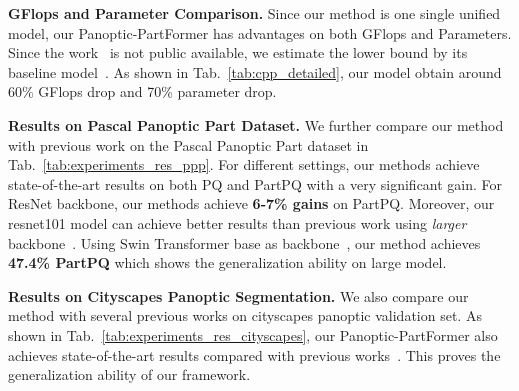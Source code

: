 \noindent
\textbf{GFlops and Parameter Comparison.} Since our method is one single unified model, our Panoptic-PartFormer has advantages on both GFlops and Parameters. Since the work~\cite{liang2020polytransform} is not public available, we estimate the lower bound by its baseline model~\cite{maskrcnn}.
As shown in Tab.~\ref{tab:cpp_detailed}, our model obtain around 60\% GFlops drop and 70\% parameter drop.

\noindent
\textbf{Results on Pascal Panoptic Part Dataset.} We further compare our method with previous work on the Pascal Panoptic Part dataset in Tab.~\ref{tab:experiments_res_ppp}. For different settings, our methods achieve state-of-the-art results on both PQ and PartPQ with a very significant gain. For ResNet backbone, our methods achieve \textbf{6-7\% gains} on PartPQ. Moreover, our resnet101 model can achieve better results than previous work using \textit{larger} backbone~\cite{qiao2021detectors}.
Using Swin Transformer base as backbone~\cite{liu2021swin}, our method achieves \textbf{47.4\% PartPQ} which shows the generalization ability on large model. 


\noindent
\textbf{Results on Cityscapes Panoptic Segmentation.}
We also compare our method with several previous works on cityscapes panoptic validation set. As shown in Tab.~\ref{tab:experiments_res_cityscapes}, our Panoptic-PartFormer also achieves state-of-the-art results compared with previous works~\cite{li2020panopticFCN,cheng2020panoptic}. This proves the generalization ability of our framework. 

\begin{table}[!t]\setlength{\tabcolsep}{6pt}
	\centering
	\begin{threeparttable}
		\caption{\small More detailed comparison on Cityscapes PPS dataset. GFlops are measured with 1200 $\times$ 800 input.}
		\label{tab:cpp_detailed}
	\end{threeparttable}
\end{table}



